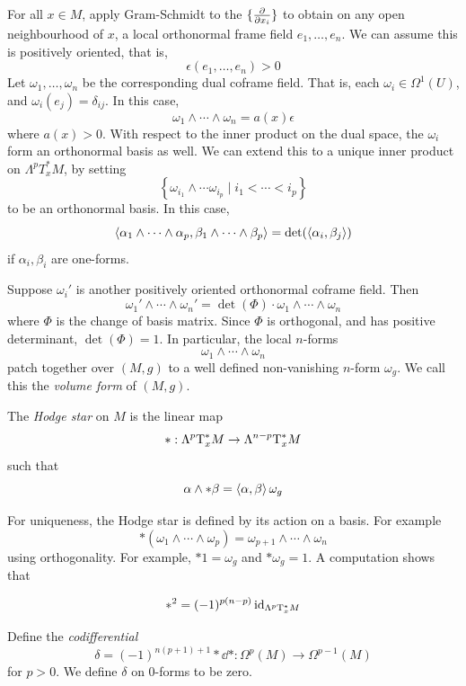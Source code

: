 \documentclass{article}
\begin{document}
For all \(x \in M\), apply Gram-Schmidt to the \(\{\pdv{x_i}\}\) to obtain on any open neighbourhood of \(x\), a local orthonormal frame field \(e_1, \dots, e_n\). We can assume this is positively oriented, that is,
\[\epsilon(e_1, \dots, e_n) > 0\]
Let \(\omega_1, \dots, \omega_n\) be the corresponding dual coframe field. That is, each \(\omega_i \in \Omega^1(U)\), and \(\omega_i(e_j) = \delta_{ij}\).
In this case,
\[\omega_1 \wedge \cdots \wedge \omega_n = a(x)\epsilon\]
where \(a(x) > 0\). With respect to the inner product on the dual space, the \(\omega_i\) form an orthonormal basis as well. We can extend this to a unique inner product on \(\Lambda^pT^*_xM\), by setting
\[\left\{\omega_{i_1}\wedge \cdots \omega_{i_p} \mid i_1 < \cdots < i_p\right\}\]
to be an orthonormal basis. In this case,
\[\left\langle \alpha_1\wedge \cdots \wedge \alpha_p, \beta_1 \wedge \cdots \wedge \beta_p \right\rangle = \det(\left\langle \alpha_i, \beta_j \right\rangle)\]
if \(\alpha_i, \beta_i\) are one-forms.

Suppose \(\omega_i'\) is another positively oriented orthonormal coframe field. Then
\[\omega_1' \wedge \cdots \wedge \omega_n' = \det (\Phi) \cdot \omega_1 \wedge \cdots \wedge \omega_n\]
where \(\Phi\) is the change of basis matrix. Since \(\Phi\) is orthogonal, and has positive determinant, \(\det(\Phi) = 1\). In particular, the local \(n\)-forms
\[\omega_1 \wedge \cdots \wedge \omega_n\]
patch together over \((M, g)\) to a well defined non-vanishing \(n\)-form \(\omega_g\). We call this the \emph{volume form} of \((M, g)\).

\begin{definition}
     The \emph{Hodge star} on \(M\) is the linear map
    \[* : \Lambda^p\mathrm{T}^*_xM \to \Lambda^{n-p}\mathrm{T}^*_xM\]
    such that
    \[\alpha \wedge *\beta = \left\langle \alpha, \beta \right\rangle \omega_g\]
\end{definition}

For uniqueness, the Hodge star is defined by its action on a basis. For example
\[*(\omega_1 \wedge \cdots \wedge \omega_p) = \omega_{p+1} \wedge \cdots \wedge \omega_n\]
using orthogonality. For example, \(*1 = \omega_g\) and \(*\omega_g = 1\). A computation shows that
\begin{lemma}
    \[*^2 = (-1)^{p(n-p)}\operatorname{id}_{\Lambda^p\mathrm{T}^*_xM}\]
\end{lemma}

\begin{definition}
    [codifferential] Define the \emph{codifferential}
    \[\delta = (-1)^{n(p+1) + 1}* \dd * : \Omega^p(M) \to \Omega^{p-1}(M)\]
    for \(p > 0\). We define \(\delta\) on \(0\)-forms to be zero.
\end{definition}
\end{document}
